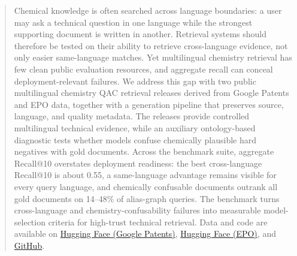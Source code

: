 \begin{abstract}
Chemical knowledge is often searched across language boundaries: a user may ask
a technical question in one language while the strongest supporting document is
written in another. Retrieval systems should therefore be tested on their ability
to retrieve cross-language evidence, not only easier same-language matches. Yet
multilingual chemistry retrieval has few clean public evaluation resources, and
aggregate recall can conceal deployment-relevant failures. We address this gap
with two public multilingual chemistry QAC retrieval releases derived from Google
Patents and EPO data, together with a generation pipeline that preserves source,
language, and quality metadata. The releases provide controlled multilingual
technical evidence, while an auxiliary ontology-based diagnostic tests whether
models confuse chemically plausible hard negatives with gold documents. Across
the benchmark suite, aggregate Recall@10 overstates deployment readiness: the
best cross-language Recall@10 is about 0.55, a same-language advantage remains
visible for every query language, and chemically confusable documents outrank all
gold documents on 14--48\% of alias-graph queries. The benchmark turns
cross-language and chemistry-confusability failures into measurable
model-selection criteria for high-trust technical retrieval. Data and code are
available on
\href{https://huggingface.co/datasets/MehdiAstaraki/multi-lingual-qac-chem-patents}{Hugging Face (Google Patents)},
\href{https://huggingface.co/datasets/MehdiAstaraki/multi-lingual-qac-epo}{Hugging Face (EPO)},
and
\href{https://github.com/MohammadKhodadad/Multi-Lingual-QAC}{GitHub}.
\end{abstract}
